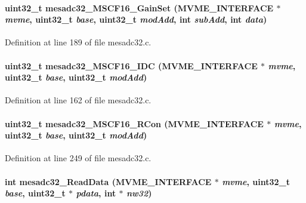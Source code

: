 \paragraph[{mesadc32\_\-MSCF16\_\-GainSet}]{\setlength{\rightskip}{0pt plus 5cm}uint32\_\-t mesadc32\_\-MSCF16\_\-GainSet ({\bf MVME\_\-INTERFACE} $\ast$ {\em mvme}, \/  uint32\_\-t {\em base}, \/  uint32\_\-t {\em modAdd}, \/  int {\em subAdd}, \/  int {\em data})}\hfill\label{mesadc32_8c_aee29b5ee58040c1c1c428e30a6fec9e9}


Definition at line 189 of file mesadc32.c.
\paragraph[{mesadc32\_\-MSCF16\_\-IDC}]{\setlength{\rightskip}{0pt plus 5cm}uint32\_\-t mesadc32\_\-MSCF16\_\-IDC ({\bf MVME\_\-INTERFACE} $\ast$ {\em mvme}, \/  uint32\_\-t {\em base}, \/  uint32\_\-t {\em modAdd})}\hfill\label{mesadc32_8c_ad6b5a83a7f9745c0102e5f6816e19e9b}


Definition at line 162 of file mesadc32.c.
\paragraph[{mesadc32\_\-MSCF16\_\-RCon}]{\setlength{\rightskip}{0pt plus 5cm}uint32\_\-t mesadc32\_\-MSCF16\_\-RCon ({\bf MVME\_\-INTERFACE} $\ast$ {\em mvme}, \/  uint32\_\-t {\em base}, \/  uint32\_\-t {\em modAdd})}\hfill\label{mesadc32_8c_ab06d3b413709d879215193ace551370a}


Definition at line 249 of file mesadc32.c.
\paragraph[{mesadc32\_\-ReadData}]{\setlength{\rightskip}{0pt plus 5cm}int mesadc32\_\-ReadData ({\bf MVME\_\-INTERFACE} $\ast$ {\em mvme}, \/  uint32\_\-t {\em base}, \/  uint32\_\-t $\ast$ {\em pdata}, \/  int $\ast$ {\em nw32})}\hfill\label{mesadc32_8c_accce492b4107160756e04f6b5daa6f9d}



